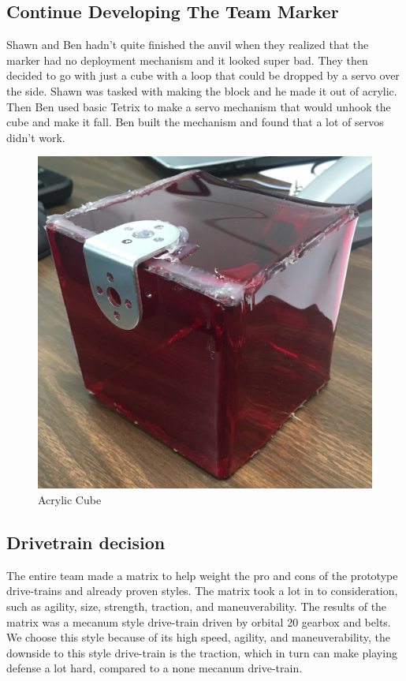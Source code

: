 \documentclass{article}
\newif\ifcontents
\begin{document}
\contentsfalse


\subsection{Continue Developing The Team Marker}
Shawn and Ben hadn't quite finished the anvil when they realized that the marker had no deployment mechanism and it looked super bad. They then decided to go with just a cube with a loop that could be dropped by a servo over the side. Shawn was tasked with making the block and he made it out of acrylic. Then Ben used basic Tetrix to make a servo mechanism that would unhook the cube and make it fall. Ben built the mechanism and found that a lot of servos didn't work.

\begin{figure}
    \centering
    \includegraphics[width=.6\textwidth]{05_10-01/images/cube.jpg}
    \caption{Acrylic Cube}
    \label{fig:cube}
\end{figure}



\subsection{Drivetrain decision}
The entire team made a matrix to help weight the pro and cons of the prototype drive-trains and already proven styles. The matrix took a lot in to consideration, such as agility, size, strength, traction, and maneuverability. The results of the matrix was a mecanum style drive-train driven by orbital 20 gearbox and belts. We choose this style because of its high speed, agility, and maneuverability, the downside to this style drive-train is the traction, which in turn can make playing defense a lot hard, compared to a none mecanum drive-train.  
\end{document}
